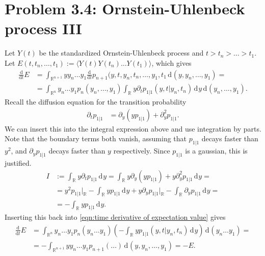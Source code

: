 \documentclass[english, parskip=full]{scrartcl}
\newcommand{\bra}{}
\newcommand{\intr}{}
\newcommand{\kla}{}
\newcommand{\tecxt}{}
\begin{document}
\newpage


\section*{Problem 3.4: Ornstein-Uhlenbeck process III}
Let $Y(t)$ be the standardized Ornstein-Uhlenbeck process and $t > t_n > \dots > t_1$.
Let $E(t,t_n,\dots,t_1) := \bra\langle Y(t)Y(t_n)\dots Y(t_1) \rangle$, which gives
\begin{align}
\frac{\tecxt\text{d}}{\tecxt\text{d}t}E &= \intr\int_{\mathbb{R}^{n+1}} yy_n\dots y_1 \frac{\tecxt\text{d}}{\tecxt\text{d}t} p_{n+1}(y,t,y_n,t_n,\dots ,y_1,t_1 \, \mathrm{d}^{}(y,y_n, \dots, y_1) = \\
&= \intr\int_{\mathbb{R}^{n }} y_n\dots y_1p_n(y_n,\dots,y_1)\intr\int_{\mathbb{R}^{ }} y\partial_t p_{1|1} (y,t|y_n,t_n) \, \mathrm{d}^{ }y \, \mathrm{d}^{}(y_n,\dots, y_1) \label{eqn:time derivative of expectation value}.
\end{align}
Recall the diffusion equation for the transition probability
\begin{align}
\partial_t p_{1|1} &= \partial_y\kla\left( yp_{1|1} \right) + \partial_y^2 p_{1|1}.
\end{align}
We can insert this into the integral expression above and use integration by parts.
Note that the boundary terms both vanish, assuming that $p_{1|1}$ decays faster than $y^2$, and $\partial_yp_{1|1}$ decays faster than $y$ respectively.
Since $p_{1|1}$ is a gaussian, this is justified.
\begin{align}
I &:= \intr\int_{\mathbb{R}^{ }} y\partial_t p_{1|1} \, \mathrm{d}^{ }y = \intr\int_{\mathbb{R}^{ }} y\partial_y\kla\left( yp_{1|1} \right) + y\partial_y^2 p_{1|1} \, \mathrm{d}^{ }y = \\
&= y^2p_{1|1}\Big\vert_\mathbb{R} - \intr\int_{\mathbb{R}^{ }} yp_{1|1} \, \mathrm{d}^{ }y + y\partial_yp_{1|1} \Big\vert_\mathbb{R} - \intr\int_{\mathbb{R}^{ }} \partial_yp_{1|1} \, \mathrm{d}^{ }y = \\
&= -\intr\int_{\mathbb{R}^{ }} yp_{1|1} \, \mathrm{d}^{ }y.
\end{align}
Inserting this back into \eqref{eqn:time derivative of expectation value} gives
\begin{align}
\frac{\tecxt\text{d}}{\tecxt\text{d}t} E &= \intr\int_{\mathbb{R}^{n}} y_n\dots y_1 p_n(y_n\dots y_1) \kla\left( -\intr\int_{\mathbb{R}^{ }} yp_{1|1}(y,t|y_n,t_n) \, \mathrm{d}^{ }y \right)   \, \mathrm{d}^{ }(y_n\dots y_1) = \\
&= -\intr\int_{\mathbb{R}^{n+1}} yy_n\dots y_1p_{n+1}(\dots) \, \mathrm{d}^{ }(y,y_n,\dots,y_1) = -E.
\end{align}
\end{document}
